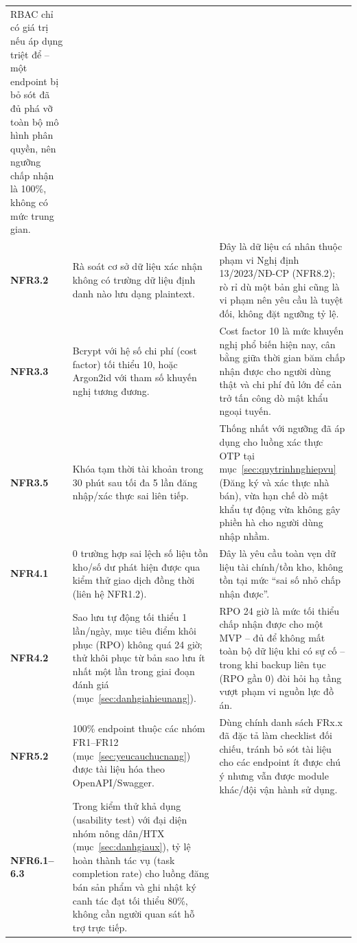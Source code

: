 \begin{longtable}{L{1.5cm} L{6.0cm} L{5.9cm}}
RBAC chỉ có giá trị nếu áp dụng triệt để -- một endpoint bị bỏ sót đã đủ phá vỡ toàn bộ mô hình phân quyền, nên ngưỡng chấp nhận là 100\%, không có mức trung gian. \\
\textbf{NFR3.2} &
Rà soát cơ sở dữ liệu xác nhận không có trường dữ liệu định danh nào lưu dạng plaintext. &
Đây là dữ liệu cá nhân thuộc phạm vi Nghị định 13/2023/NĐ-CP (NFR8.2); rò rỉ dù một bản ghi cũng là vi phạm nên yêu cầu là tuyệt đối, không đặt ngưỡng tỷ lệ. \\
\textbf{NFR3.3} &
Bcrypt với hệ số chi phí (cost factor) tối thiểu 10, hoặc Argon2id với tham số khuyến nghị tương đương. &
Cost factor 10 là mức khuyến nghị phổ biến hiện nay, cân bằng giữa thời gian băm chấp nhận được cho người dùng thật và chi phí đủ lớn để cản trở tấn công dò mật khẩu ngoại tuyến. \\
\textbf{NFR3.5} &
Khóa tạm thời tài khoản trong 30 phút sau tối đa 5 lần đăng nhập/xác thực sai liên tiếp. &
Thống nhất với ngưỡng đã áp dụng cho luồng xác thực OTP tại mục~\ref{sec:quytrinhnghiepvu} (Đăng ký và xác thực nhà bán), vừa hạn chế dò mật khẩu tự động vừa không gây phiền hà cho người dùng nhập nhầm. \\
\textbf{NFR4.1} &
0 trường hợp sai lệch số liệu tồn kho/số dư phát hiện được qua kiểm thử giao dịch đồng thời (liên hệ NFR1.2). &
Đây là yêu cầu toàn vẹn dữ liệu tài chính/tồn kho, không tồn tại mức ``sai số nhỏ chấp nhận được''. \\
\textbf{NFR4.2} &
Sao lưu tự động tối thiểu 1 lần/ngày, mục tiêu điểm khôi phục (RPO) không quá 24 giờ; thử khôi phục từ bản sao lưu ít nhất một lần trong giai đoạn đánh giá (mục~\ref{sec:danhgiahieunang}). &
RPO 24 giờ là mức tối thiểu chấp nhận được cho một MVP -- đủ để không mất toàn bộ dữ liệu khi có sự cố -- trong khi backup liên tục (RPO gần 0) đòi hỏi hạ tầng vượt phạm vi nguồn lực đồ án. \\
\textbf{NFR5.2} &
100\% endpoint thuộc các nhóm FR1--FR12 (mục~\ref{sec:yeucauchucnang}) được tài liệu hóa theo OpenAPI/Swagger. &
Dùng chính danh sách FRx.x đã đặc tả làm checklist đối chiếu, tránh bỏ sót tài liệu cho các endpoint ít được chú ý nhưng vẫn được module khác/đội vận hành sử dụng. \\
\textbf{NFR6.1--6.3} &
Trong kiểm thử khả dụng (usability test) với đại diện nhóm nông dân/HTX (mục~\ref{sec:danhgiaux}), tỷ lệ hoàn thành tác vụ (task completion rate) cho luồng đăng bán sản phẩm và ghi nhật ký canh tác đạt tối thiểu 80\%, không cần người quan sát hỗ trợ trực tiếp. &

\end{longtable}
